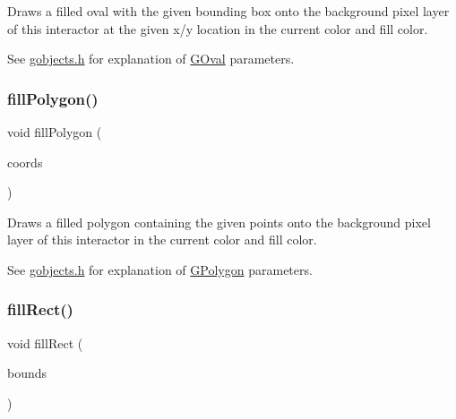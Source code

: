 Draws a filled oval with the given bounding box onto the background pixel layer of this interactor at the given x/y location in the current color and fill color. 

See \mbox{\hyperlink{gobjects_8h_source}{gobjects.\+h}} for explanation of \mbox{\hyperlink{classGOval}{G\+Oval}} parameters. \mbox{\label{classGDrawingSurface_a15f8c1c4409ef51c1a30a92a195b8f66}} 
\subsubsection{\texorpdfstring{fill\+Polygon()}{fillPolygon()}}
{\footnotesize\ttfamily void fill\+Polygon (\begin{DoxyParamCaption}\item[{std\+::initializer\+\_\+list$<$ double $>$}]{coords }\end{DoxyParamCaption})\hspace{0.3cm}{\ttfamily [virtual]}}



Draws a filled polygon containing the given points onto the background pixel layer of this interactor in the current color and fill color. 

See \mbox{\hyperlink{gobjects_8h_source}{gobjects.\+h}} for explanation of \mbox{\hyperlink{classGPolygon}{G\+Polygon}} parameters. \mbox{\label{classGDrawingSurface_ae6582295003bf2488836b1993dadbad7}} 
\subsubsection{\texorpdfstring{fill\+Rect()}{fillRect()}\hspace{0.1cm}{\footnotesize\ttfamily [1/2]}}
{\footnotesize\ttfamily void fill\+Rect (\begin{DoxyParamCaption}\item[{const \mbox{\hyperlink{classGRectangle}{G\+Rectangle}} \&}]{bounds }\end{DoxyParamCaption})\hspace{0.3cm}{\ttfamily [virtual]}}



